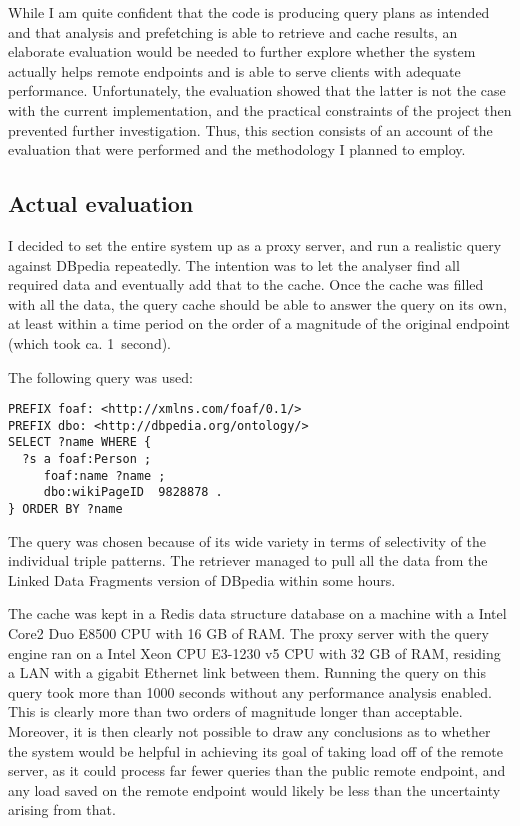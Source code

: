 \documentclass[a4paper, 12pt]{article}
\begin{document}
While I am quite confident that the code is producing query plans as
intended and that analysis and prefetching is able to retrieve and
cache results, an elaborate evaluation would be needed to further
explore whether the system actually helps remote endpoints and is able
to serve clients with adequate performance. Unfortunately, the
evaluation showed that the latter is not the case with the current
implementation, and the practical constraints of the project then
prevented further investigation. Thus, this section consists of an
account of the evaluation that were performed and the methodology I
planned to employ.

\subsection{Actual evaluation}

I decided to set the entire system up as a proxy server, and run a
realistic query against DBpedia repeatedly. The intention was to let
the analyser find all required data and eventually add that to the
cache. Once the cache was filled with all the data, the query cache
should be able to answer the query on its own, at least within a time
period on the order of a magnitude of the original endpoint (which
took ca. 1~second). 

The following query was used:

\begin{verbatim}
PREFIX foaf: <http://xmlns.com/foaf/0.1/>
PREFIX dbo: <http://dbpedia.org/ontology/>
SELECT ?name WHERE {
  ?s a foaf:Person ;
     foaf:name ?name ;
     dbo:wikiPageID  9828878 .
} ORDER BY ?name
\end{verbatim}

The query was chosen because of its wide variety in terms of
selectivity of the individual triple patterns. The retriever managed
to pull all the data from the Linked Data Fragments version of DBpedia
within some hours. 

The cache was kept in a Redis data structure database on a machine
with a Intel Core2 Duo E8500 CPU with 16 GB of RAM. The proxy server
with the query engine ran on a Intel Xeon CPU E3-1230 v5 CPU with 32
GB of RAM, residing a LAN with a gigabit Ethernet link between
them. Running the query on this query took more than 1000 seconds
without any performance analysis enabled. This is clearly more than
two orders of magnitude longer than acceptable. Moreover, it is then
clearly not possible to draw any conclusions as to whether the system
would be helpful in achieving its goal of taking load off of the
remote server, as it could process far fewer queries than the public
remote endpoint, and any load saved on the remote endpoint would
likely be less than the uncertainty arising from that.
\end{document}
